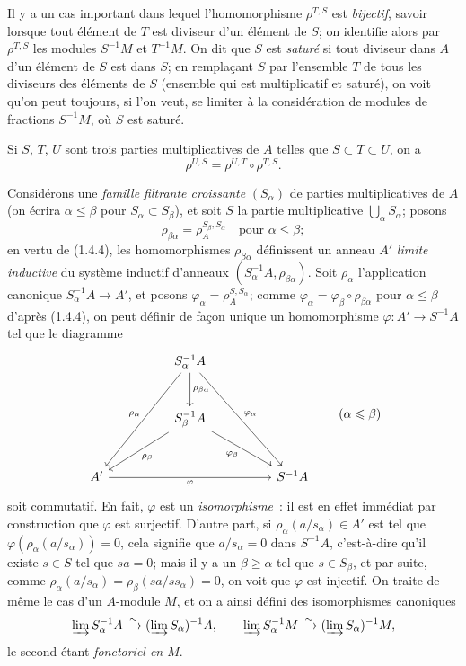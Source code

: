\begin{env}[1.4.3]
\label{0.1.4.3-fr}
Il y a un cas important dans lequel l'homomorphisme $\rho^{T,S}$ est \emph{bijectif}, savoir lorsque tout élément de $T$ est diviseur d'un élément de $S$; on identifie alors par $\rho^{T,S}$ les modules $S^{-1}M$ et $T^{-1}M$.
On dit que $S$ est \emph{saturé} si tout diviseur dans $A$ d'un élément de $S$ est dans $S$; en remplaçant $S$ par l'ensemble $T$ de tous les diviseurs des éléments de $S$ (ensemble qui est multiplicatif et saturé), on voit qu'on peut toujours, si l'on veut, se limiter à la considération de modules de fractions $S^{-1}M$, où $S$ est saturé.
\end{env}

\begin{env}[1.4.4]
\label{0.1.4.4-fr}
Si $S$, $T$, $U$ sont trois parties multiplicatives de $A$ telles que $S\subset T\subset U$, on a
\[
  \rho^{U,S}=\rho^{U,T}\circ\rho^{T,S}.
\]
\end{env}

\begin{env}[1.4.5]
\label{0.1.4.5-fr}
Considérons une \emph{famille filtrante croissante} $(S_\alpha)$ de parties multiplicatives de $A$ (on écrira $\alpha\leq\beta$ pour $S_\alpha\subset S_\beta$), et soit $S$ la partie multiplicative $\bigcup_\alpha S_\alpha$; posons
\[
  \rho_{\beta\alpha}=\rho_A^{S_\beta,S_\alpha}\quad\text{pour }\alpha\leq\beta;
\]
en vertu de (1.4.4), les homomorphismes $\rho_{\beta\alpha}$ définissent un anneau $A'$ \emph{limite inductive} du système inductif d'anneaux $(S_\alpha^{-1}A,\rho_{\beta\alpha})$.
Soit $\rho_\alpha$ l'application canonique $S_\alpha^{-1}A\to A'$, et posons $\varphi_\alpha=\rho_A^{S,S_\alpha}$; comme $\varphi_\alpha=\varphi_\beta\circ\rho_{\beta\alpha}$ pour $\alpha\leq\beta$ d'après (1.4.4), on peut définir de façon unique un homomorphisme $\varphi:A'\to S^{-1}A$ tel que le diagramme
\[
\begin{tikzcd}[column sep=huge,row sep=large]
  & S_\alpha^{-1}A
      \arrow[ddl,"\rho_\alpha"']
      \arrow[d,"\rho_{\beta\alpha}"]
      \arrow[ddr,"\varphi_\alpha"] & \\
  & S_\beta^{-1}A
      \arrow[dl,"\rho_\beta"]
      \arrow[dr,"\varphi_\beta"'] & \\
A' \arrow[rr,"\varphi"'] & & S^{-1}A
\end{tikzcd}
\qquad(\alpha\leq\beta)
\]
soit commutatif.
En fait, $\varphi$ est un \emph{isomorphisme}~: il est en effet immédiat par construction que $\varphi$ est surjectif.
D'autre part, si $\rho_\alpha(a/s_\alpha)\in A'$ est tel que $\varphi(\rho_\alpha(a/s_\alpha))=0$, cela signifie que $a/s_\alpha=0$ dans $S^{-1}A$, c'est-à-dire qu'il existe $s\in S$ tel que $sa=0$; mais il y a un $\beta\geq\alpha$ tel que $s\in S_\beta$, et par suite, comme $\rho_\alpha(a/s_\alpha)=\rho_\beta(sa/ss_\alpha)=0$, on voit que $\varphi$ est injectif.
On traite de même le cas d'un $A$-module $M$, et on a ainsi défini des isomorphismes canoniques
\[
  \varinjlim S_\alpha^{-1}A\xrightarrow{\sim}
  (\varinjlim S_\alpha)^{-1}A,
  \qquad
  \varinjlim S_\alpha^{-1}M\xrightarrow{\sim}
  (\varinjlim S_\alpha)^{-1}M,
\]
le second étant \emph{fonctoriel en $M$}.
\end{env}

